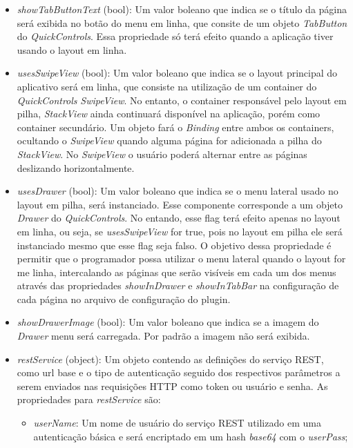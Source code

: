 \begin{itemize}
	\item \textit{showTabButtonText} (bool): Um valor boleano que indica se o título da página será exibida no botão do menu em linha, que consite de um objeto \textit{TabButton} do \textit{QuickControls}. Essa propriedade só terá efeito quando a aplicação tiver usando o layout em linha.

	\item \textit{usesSwipeView} (bool): Um valor boleano que indica se o layout principal do aplicativo será em linha, que consiste na utilização de um container do \textit{QuickControls} \textit{SwipeView}. No entanto, o container responsável pelo layout em pilha, \textit{StackView} ainda continuará disponível na aplicação, porém como container secundário. Um objeto fará o \textit{Binding} entre ambos os containers, ocultando o \textit{SwipeView} quando alguma página for adicionada a pilha do \textit{StackView}. No \textit{SwipeView} o usuário poderá alternar entre as páginas deslizando horizontalmente.

	\item \textit{usesDrawer} (bool): Um valor boleano que indica se o menu lateral usado no layout em pilha, será instanciado. Esse componente corresponde a um objeto \textit{Drawer} do \textit{QuickControls}. No entando, esse flag terá efeito apenas no layout em linha, ou seja, se \textit{usesSwipeView} for true, pois no layout em pilha ele será instanciado mesmo que esse flag seja falso. O objetivo dessa propriedade é permitir que o programador possa utilizar o menu lateral quando o layout for me linha, intercalando as páginas que serão visíveis em cada um dos menus através das propriedades \textit{showInDrawer} e \textit{showInTabBar} na configuração de cada página no arquivo de configuração do plugin.

	\item \textit{showDrawerImage} (bool): Um valor boleano que indica se a imagem do \textit{Drawer} menu será carregada. Por padrão a imagem não será exibida.

	\item \textit{restService} (object): Um objeto contendo as definições do serviço REST, como url base e o tipo de autenticação seguido dos respectivos parâmetros a serem enviados nas requisições HTTP como token ou usuário e senha. As propriedades para \textit{restService} são: 

	\begin{itemize}
		\item \textit{userName}: Um nome de usuário do serviço REST utilizado em uma autenticação básica e será encriptado em um hash \textit{base64} com o \textit{userPass};


\end{itemize}
\end{itemize}

